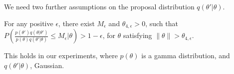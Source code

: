 

We need two further assumptions on the proposal distribution $q(\theta'|\theta)$.
\begin{assumption}
For any positive $\epsilon$,  there exist $M_\epsilon$ and $\theta_{4,\epsilon} > 0$,
such that $P(\frac{p(\theta')q(\theta|\theta')}{p(\theta)q(\theta'|\theta)} \le M_\epsilon | \theta) > 1 - \epsilon$,
for $\theta$ satisfying $\| \theta \|  > \theta_{4,\epsilon}$.
  \label{asmp:prior}
\end{assumption}
This holds in our experiments, where $p(\theta)$ is a gamma distribution,
and $q(\theta'|\theta)$, Gaussian.


